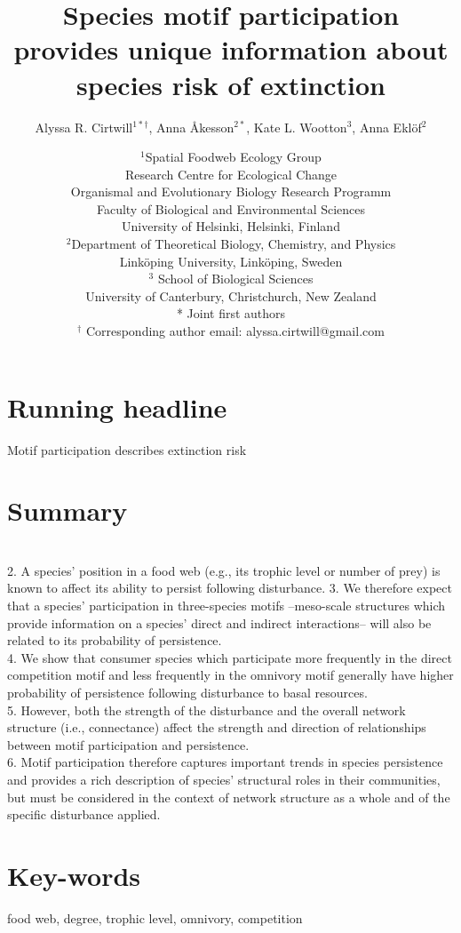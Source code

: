 \documentclass[12pt]{article}
\title{Species motif participation provides unique information about species risk of extinction}
\author{Alyssa R. Cirtwill$^{1*\dagger}$, Anna \r{A}kesson$^{2*}$, Kate L. Wootton$^{3}$, Anna Ekl\"{o}f$^{2}$}
\date{
\small$^1$Spatial Foodweb Ecology Group\\
Research Centre for Ecological Change\\
Organismal and Evolutionary Biology Research Programm\\
Faculty of Biological and Environmental Sciences\\
University of Helsinki, Helsinki, Finland\\
\medskip
\small$^2$Department of Theoretical Biology, Chemistry, and Physics\\ 
Link\"{o}ping University, Link\"{o}ping, Sweden\\
\medskip
\small$^3$ School of Biological Sciences\\
University of Canterbury, Christchurch, New Zealand\\
\medskip
* Joint first authors\\
\medskip
$^\dagger$ Corresponding author email: alyssa.cirtwill@gmail.com\\
}
\begin{document}
 
\maketitle 
\raggedright

\setlength{\parindent}{15pt} 

\section*{Running headline}
Motif participation describes extinction risk

\clearpage

\section*{Summary}


     \\
    2. A species' position in a food web (e.g., its trophic level or number of prey) is known to affect its ability to persist following disturbance.
    3. We therefore expect that a species' participation in three-species motifs --meso-scale structures which provide information on a species' direct and indirect interactions-- will also be related to its probability of persistence.\\
    4. We show that consumer species which participate more frequently in the direct competition motif and less frequently in the omnivory motif generally have higher probability of persistence following disturbance to basal resources.\\
    5. However, both the strength of the disturbance and the overall network structure (i.e., connectance) affect the strength and direction of relationships between motif participation and persistence.\\
    6. Motif participation therefore captures important trends in species persistence and provides a rich description of species' structural roles in their communities, but must be considered in the context of network structure as a whole and of the specific disturbance applied.


\section*{Key-words}
    food web, degree, trophic level, omnivory, competition
\end{document}
